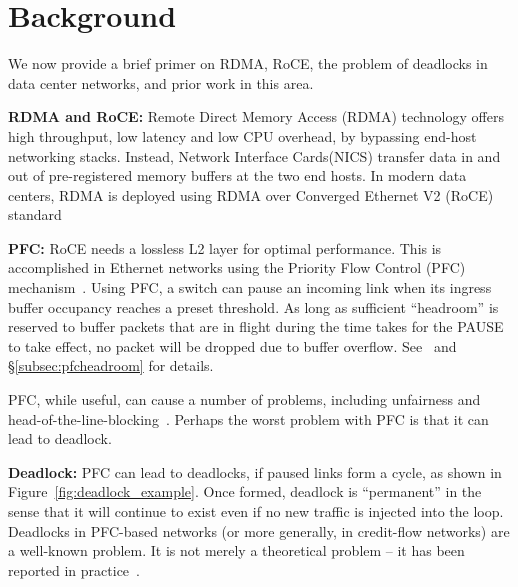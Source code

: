 \section{Background}

We now provide a brief primer on RDMA, RoCE, the problem of deadlocks in data
center networks, and prior work in this area.

{\bf RDMA and RoCE:} Remote Direct Memory Access (RDMA) technology offers high
throughput, low latency and low CPU overhead, by bypassing end-host networking
stacks. Instead, Network Interface Cards(NICS) transfer data in and out of
pre-registered memory buffers at the two end hosts.  In modern data centers,
RDMA is deployed using RDMA over Converged Ethernet V2 (RoCE)
standard~\cite{roce,rroce}

{\bf PFC:} RoCE needs a lossless L2 layer for optimal performance. This is
accomplished in Ethernet networks using the Priority Flow Control (PFC)
mechanism~\cite{pfc}.  Using PFC, a switch can pause an incoming link when its
ingress buffer occupancy reaches a preset threshold. As long as sufficient
``headroom'' is reserved to buffer packets that are in flight during the time
takes for the PAUSE to take effect, no packet will be dropped due to buffer
overflow. See~\cite{cisco-whitepaper,dcqcn} and \S\ref{subsec:pfcheadroom} for
details.

PFC, while useful, can cause a number of problems, including unfairness and
head-of-the-line-blocking~\cite{dcqcn}. Perhaps the worst problem with PFC is
that it can lead to deadlock.


{\bf Deadlock:} PFC can lead to deadlocks, if paused links form a cycle, as
shown in Figure~\ref{fig:deadlock_example}. Once formed, deadlock is
``permanent'' in the sense that it will continue to exist even if no new traffic
is injected into the loop. Deadlocks in PFC-based networks (or more generally,
in credit-flow networks) are a well-known problem. It is not merely a
theoretical problem -- it has been reported in practice~\cite{rdmaatscale}.

